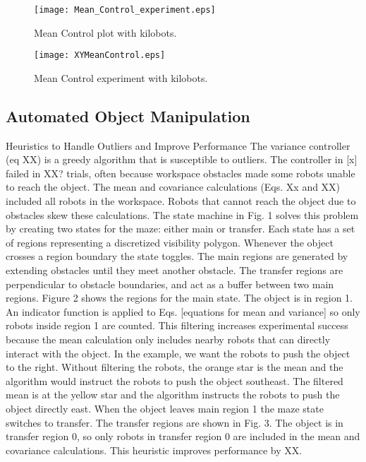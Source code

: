 \begin{figure}
\begin{center}
	\texttt{[image: Mean\_Control\_experiment.eps]}
\end{center}
\caption{\label{fig:realMean}
Mean Control plot with kilobots.
}
\end{figure}

\begin{figure}
\begin{center}
	\texttt{[image: XYMeanControl.eps]}
\end{center}
\caption{\label{fig:meanRobotFig}
Mean Control experiment with kilobots.
}
\end{figure}

\subsection{Automated Object Manipulation}
Heuristics to Handle Outliers and Improve Performance
The variance controller (eq XX) is a greedy algorithm that is susceptible to outliers. The controller in [x] failed in XX? trials, often because workspace obstacles made some robots unable to reach the object. The mean and covariance calculations (Eqs. Xx and XX) included all robots in the workspace. Robots that cannot reach the object due to obstacles skew these calculations. The state machine in Fig. 1 solves this problem by creating two states for the maze: either main or transfer. Each state has a set of regions representing a discretized visibility polygon. Whenever the object crosses a region boundary the state toggles. The main regions are generated by extending obstacles until they meet another obstacle. The transfer regions are perpendicular to obstacle boundaries, and act as a buffer between two main regions.
Figure 2 shows the regions for the main state. The object is in region 1. An indicator function is applied to Eqs. [equations for mean and variance] so only robots inside region 1 are counted.  This filtering increases experimental success because the mean calculation only includes nearby robots that can directly interact with the object. In the example, we want the robots to push the object to the right. Without filtering the robots, the orange star is the mean and the algorithm would instruct the robots to push the object southeast. The filtered mean is at the yellow star and the algorithm instructs the robots to push the object directly east. 
When the object leaves main region 1 the maze state switches to transfer. The transfer regions are shown in Fig. 3.  The object is in transfer region 0, so only robots in transfer region 0 are included in the mean and covariance calculations.  
This heuristic improves performance by XX.


